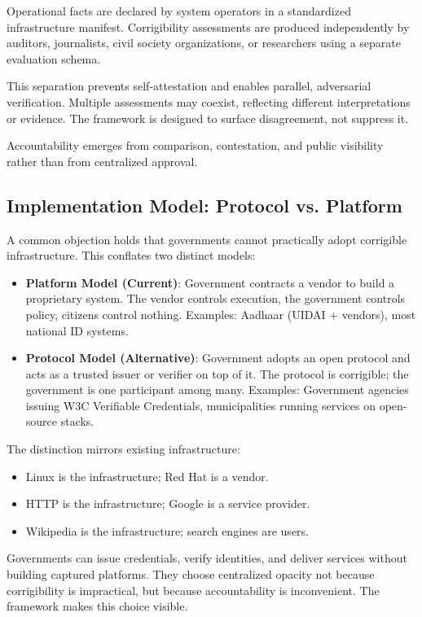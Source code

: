 \documentclass[11pt,a4paper]{article}
\begin{document}
Operational facts are declared by system operators in a standardized infrastructure manifest. Corrigibility assessments are produced independently by auditors, journalists, civil society organizations, or researchers using a separate evaluation schema.

This separation prevents self-attestation and enables parallel, adversarial verification. Multiple assessments may coexist, reflecting different interpretations or evidence. The framework is designed to surface disagreement, not suppress it.

Accountability emerges from comparison, contestation, and public visibility rather than from centralized approval.

\subsection{Implementation Model: Protocol vs. Platform}

A common objection holds that governments cannot practically adopt corrigible infrastructure. This conflates two distinct models:

\begin{itemize}
    \item \textbf{Platform Model (Current)}: Government contracts a vendor to build a proprietary system. The vendor controls execution, the government controls policy, citizens control nothing. Examples: Aadhaar (UIDAI + vendors), most national ID systems.
    \item \textbf{Protocol Model (Alternative)}: Government adopts an open protocol and acts as a trusted issuer or verifier on top of it. The protocol is corrigible; the government is one participant among many. Examples: Government agencies issuing W3C Verifiable Credentials, municipalities running services on open-source stacks.
\end{itemize}

The distinction mirrors existing infrastructure:
\begin{itemize}
    \item Linux is the infrastructure; Red Hat is a vendor.
    \item HTTP is the infrastructure; Google is a service provider.
    \item Wikipedia is the infrastructure; search engines are users.
\end{itemize}

Governments can issue credentials, verify identities, and deliver services without building captured platforms. They choose centralized opacity not because corrigibility is impractical, but because accountability is inconvenient. The framework makes this choice visible.
\end{document}
